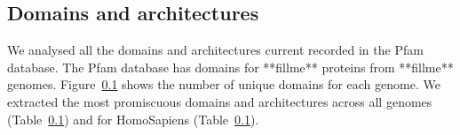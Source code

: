 

\subsection{Domains and architectures}
We analysed all the domains and architectures current recorded in the Pfam database. The Pfam database has domains for **fillme** proteins from **fillme** genomes. Figure~\ref{} shows the number of unique domains for each genome. We extracted the most promiscuous domains and architectures across all genomes (Table~\ref{}) and for HomoSapiens (Table~\ref{}).


